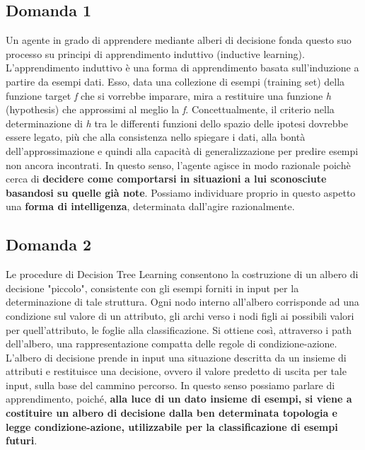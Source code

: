 		\subsection{Domanda 1}
			Un agente in grado di apprendere mediante alberi di decisione fonda questo suo processo su principi di apprendimento induttivo (\textsf{inductive learning}). L'apprendimento induttivo è una forma di apprendimento basata sull'induzione a partire da esempi dati. Esso, data una collezione di esempi (\textsf{training set}) della funzione \textsf{target} \emph{f} che si vorrebbe imparare, mira a restituire una funzione \emph{h} (\textsf{hypothesis}) che approssimi al meglio la \emph{f}. Concettualmente, il criterio nella determinazione di \emph{h} tra le differenti funzioni dello spazio delle ipotesi dovrebbe essere legato, più che alla consistenza nello spiegare i dati, alla bontà dell'approssimazione e quindi alla capacità di generalizzazione per predire esempi non ancora incontrati. In questo senso, l'agente agisce in modo razionale poichè cerca di \textbf{decidere come comportarsi in situazioni a lui sconosciute basandosi su quelle già note}. Possiamo individuare proprio in questo aspetto una \textbf{forma di intelligenza}, determinata dall'agire razionalmente.
		\bigskip
		\subsection{Domanda 2}
			Le procedure di \textsf{Decision Tree Learning} consentono la costruzione di un albero di decisione "piccolo", consistente con gli esempi forniti in input per la determinazione di tale struttura. Ogni nodo interno all'albero corrisponde ad una condizione sul valore di un attributo, gli archi verso i nodi figli ai possibili valori per quell'attributo, le foglie alla classificazione. Si ottiene così, attraverso i \textsf{path} dell'albero, una rappresentazione compatta delle regole di condizione-azione. L'albero di decisione prende in input una situazione descritta da un insieme di attributi e restituisce una decisione, ovvero il valore predetto di uscita per tale input, sulla base del cammino percorso. In questo senso possiamo parlare di apprendimento, poiché, \textbf{alla luce di un dato insieme di esempi, si viene a costituire un albero di decisione dalla ben determinata topologia e legge condizione-azione, utilizzabile per la classificazione di esempi futuri}.
